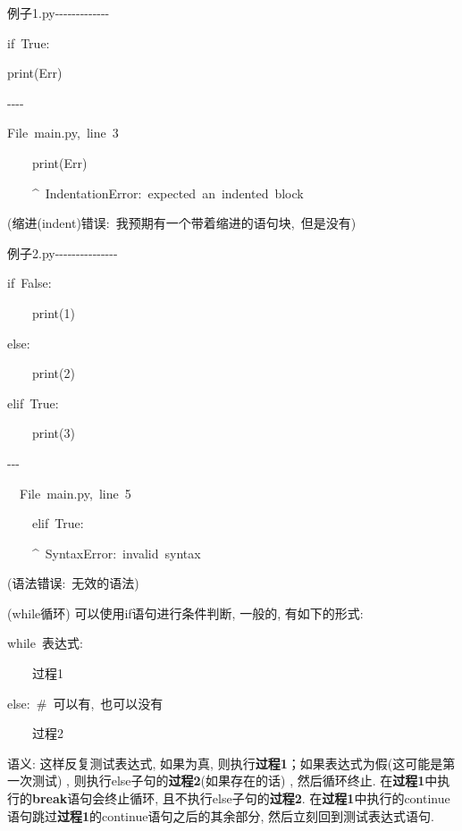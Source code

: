 \begin{lyxcode}
例子1.py-{}-{}-{}-{}-{}-{}-{}-{}-{}-{}-{}-{}-

if~True:

print(\textquotedbl Err\textquotedbl )

-{}-{}-{}-

File~\textquotedbl main.py\textquotedbl ,~line~3

~~~~print(\textquotedbl Err\textquotedbl )

~~~~\textasciicircum ~IndentationError:~expected~an~indented~block

(缩进(indent)错误:~我预期有一个带着缩进的语句块,~但是没有)

例子2.py-{}-{}-{}-{}-{}-{}-{}-{}-{}-{}-{}-{}-{}-{}-

if~False:

~~~~print(1)

else:

~~~~print(2)

elif~True:

~~~~print(3)

-{}-{}-

~~File~\textquotedbl main.py\textquotedbl ,~line~5

~~~~elif~True:

~~~~\textasciicircum ~SyntaxError:~invalid~syntax

(语法错误:~无效的语法)
\end{lyxcode}
\begin{definition}
(while循环) 可以使用if语句进行条件判断, 一般的, 有如下的形式:

\noindent\begin{minipage}[t]{1\columnwidth}%
\begin{lyxcode}
while~表达式:

~~~~过程1

else:~\#~可以有,~也可以没有

~~~~过程2
\end{lyxcode}
%
\end{minipage}
\end{definition}
语义: 这样反复测试表达式, 如果为真, 则执行\textbf{过程1}；如果表达式为假(这可能是第一次测试) , 则执行else子句的\textbf{过程2}(如果存在的话)
, 然后循环终止. 在\textbf{过程1}中执行的\textbf{break}语句会终止循环, 且不执行else子句的\textbf{过程2}.
在\textbf{过程1}中执行的continue语句跳过\textbf{过程1}的continue语句之后的其余部分, 然后立刻回到测试表达式语句. 

